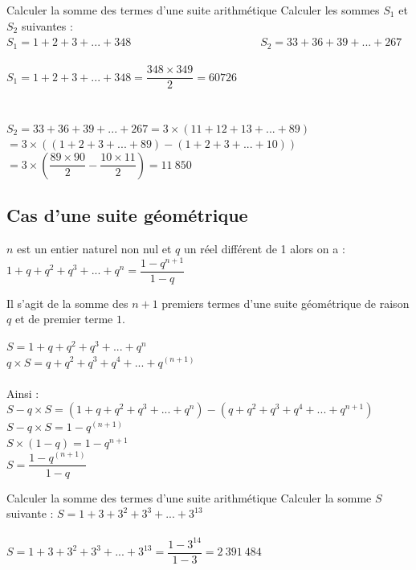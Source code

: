 \begin{methodeTitre}{Calculer la somme des termes d'une suite arithmétique}
    Calculer les sommes $S_1$ et $S_2$ suivantes :\\ 
    $S_1=1+2+3+...+348$\ \ \ \ \ \ \ \ \ \ \ \ \ \ \ \ \ \ \ \ \ \ \ $S_2=33+36+39+...+267$
    \\
    \\
    $S_1=1+2+3+...+348=\dfrac{348\times 349}{2}=60726$\\
    \\
    \\
    $S_2=33+36+39+...+267=3\times(11+12+13+...+89)$\\
    $=3\times((1+2+3+...+89)-(1+2+3+...+10))$\\
    $=3\times \left(\dfrac{89\times 90}{2}-\dfrac{10\times11}{2}\right)=11\ 850$
\end{methodeTitre}

\subsection{Cas d'une suite géométrique}

\begin{propriete}
    $n$ est un entier naturel non nul et $q$ un réel différent de 1 alors on a :\\ 
    $1+q+q^2+q^3+...+q^n= \dfrac{1-q^{n+1}}{1-q}$
\end{propriete}

\begin{remarque}
    Il s'agit de la somme des $n+1$ premiers termes d'une suite géométrique de raison $q$ et de premier terme $1$.
\end{remarque}

\begin{demonstration}
    $S=1+q+q^2+q^3+...+q^n$\\
    $q\times S=q+q^2+q^3+q^4+...+q^(n+1)$\\
    \\
    Ainsi :\\
    $S-q\times S=(1+q+q^2+q^3+...+q^n )-(q+q^2+q^3+q^4+...+q^{n+1})$\\
    $S-q\times S=1-q^(n+1)$\\
    $S\times (1-q)=1-q^{n+1}$\\
    $S=\dfrac{1-q^(n+1)}{1-q}$
\end{demonstration}

\begin{methodeTitre}{Calculer la somme des termes d'une suite arithmétique}
Calculer la somme $S$ suivante : 
$S=1+3+3^2+3^3+...+3^{13}$\\
\\
$S=1+3+3^2+3^3+...+3^{13}=\dfrac{1-3^{14}}{1-3}=2\  391\  484$

\end{methodeTitre}


